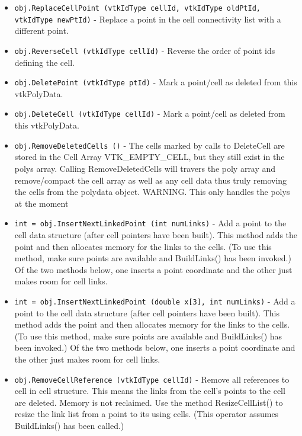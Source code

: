 \begin{itemize}
\item  \verb|obj.ReplaceCellPoint (vtkIdType cellId, vtkIdType oldPtId, vtkIdType newPtId)| -  Replace a point in the cell connectivity list with a different point.

\item  \verb|obj.ReverseCell (vtkIdType cellId)| -  Reverse the order of point ids defining the cell.

\item  \verb|obj.DeletePoint (vtkIdType ptId)| -  Mark a point/cell as deleted from this vtkPolyData.

\item  \verb|obj.DeleteCell (vtkIdType cellId)| -  Mark a point/cell as deleted from this vtkPolyData.

\item  \verb|obj.RemoveDeletedCells ()| -  The cells marked by calls to DeleteCell are stored in the Cell Array
 VTK\_EMPTY\_CELL, but they still exist in the polys array.
 Calling RemoveDeletedCells will travers the poly array and remove/compact
 the cell array as well as any cell data thus truly removing the cells
 from the polydata object. WARNING. This only handles the polys 
 at the moment

\item  \verb|int = obj.InsertNextLinkedPoint (int numLinks)| -  Add a point to the cell data structure (after cell pointers have been
 built). This method adds the point and then allocates memory for the
 links to the cells.  (To use this method, make sure points are available
 and BuildLinks() has been invoked.) Of the two methods below, one inserts
 a point coordinate and the other just makes room for cell links.

\item  \verb|int = obj.InsertNextLinkedPoint (double x[3], int numLinks)| -  Add a point to the cell data structure (after cell pointers have been
 built). This method adds the point and then allocates memory for the
 links to the cells.  (To use this method, make sure points are available
 and BuildLinks() has been invoked.) Of the two methods below, one inserts
 a point coordinate and the other just makes room for cell links.

\item  \verb|obj.RemoveCellReference (vtkIdType cellId)| -  Remove all references to cell in cell structure. This means the links from
 the cell's points to the cell are deleted. Memory is not reclaimed. Use the
 method ResizeCellList() to resize the link list from a point to its using 
 cells. (This operator assumes BuildLinks() has been called.)


\end{itemize}
